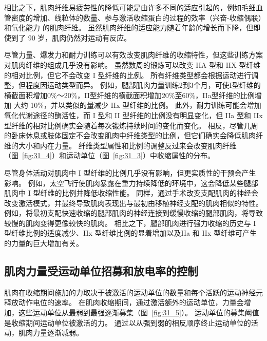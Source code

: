 相比之下，肌肉纤维易疲劳性的降低可能是由许多不同的适应引起的，例如毛细血管密度的增加、线粒体的数量、参与激活收缩蛋白的过程的效率（兴奋-收缩偶联）和氧化能力 的肌肉纤维。
虽然肌肉纤维的适应能力随着年龄的增长而下降，但即使到了 90 岁，肌肉仍然对运动有反应。


尽管力量、爆发力和耐力训练可以有效改变肌肉纤维的收缩特性，但这些训练方案对肌肉纤维的组成几乎没有影响。
虽然数周的锻炼可以改变 IIA 型和 IIX 型纤维的相对比例，但它不会改变 I 型纤维的比例。
所有纤维类型都会根据运动进行调整，但程度因运动类型而异。
例如，腿部肌肉力量训练2到3个月，可使I型纤维的横截面积增加0\%～20\%，II型纤维的横截面积增加20\%至60\%，IIa型纤维的比例增加 大约 10\%，并以类似的量减少 IIx 型纤维的比例。
此外，耐力训练可能会增加氧化代谢途径的酶活性，而 I 型和 II 型纤维的比例没有明显变化，但 IIa 型和 IIx 型纤维的相对比例确实会随着每次锻炼持续时间的变化而变化。
相反，尽管几周的卧床休息或肢体固定不会改变肌肉中纤维类型的比例，但它们确实会降低肌肉纤维的大小和内在力量。
纤维类型属性和比例的调整反过来会改变肌肉纤维（图~\ref{fig:31_4}）和运动单位（图~\ref{fig:31_3}）中收缩属性的分布。


尽管身体活动对肌肉中 I 型纤维的比例几乎没有影响，但更实质性的干预会产生影响。
例如，太空飞行使肌肉暴露在重力持续降低的环境中，这会降低某些腿部肌肉中 I 型纤维的比例并降低收缩性能。
同样，通过手术改变支配肌肉的神经会改变激活模式，并最终导致肌肉表现出与最初由移植神经支配的肌肉相似的特性。
例如，将最初支配快速收缩的腿部肌肉的神经连接到缓慢收缩的腿部肌肉，将导致较慢的肌肉变得更像较快的肌肉。
相比之下，腿部肌肉进行强力收缩的历史与 I 型纤维比例的适度减少、IIx 型纤维比例的显着增加以及IIa 和 IIx 型纤维可产生的力量的巨大增加有关。 



\subsection{肌肉力量受运动单位招募和放电率的控制}

肌肉在收缩期间施加的力取决于被激活的运动单位的数量和每个活跃的运动神经元释放动作电位的速率。
在肌肉收缩期间，通过激活额外的运动单位，力量会增加，这些运动单位从最弱到最强逐渐募集（图~\ref{fig:31_5}）。
运动单位的募集阈值是收缩期间运动单位被激活的力。
通过以从强到弱的相反顺序终止运动单位的活动，肌肉力量逐渐减弱。


